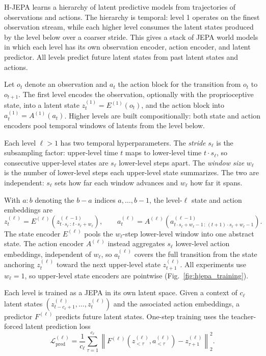 H-JEPA learns a hierarchy of latent predictive models from trajectories of
observations and actions.  The hierarchy is temporal: level 1 operates on the
finest observation stream, while each higher level consumes the latent states
produced by the level below over a coarser stride.  This gives a stack of JEPA
world models in which each level has its own observation encoder, action encoder, and
latent predictor. All levels predict future
latent states from past latent states and actions.

Let $o_t$ denote an observation and $a_t$ the action block for the transition
from $o_t$ to $o_{t+1}$.  The first level encodes the observation, optionally with
the proprioceptive state, into a latent state $z^{(1)}_t = E^{(1)}(o_t)$, and the
action block into $a^{(1)}_t = A^{(1)}(a_t)$.  Higher levels are built
compositionally: both state and action encoders pool temporal windows of latents from the level below.

Each level $\ell>1$ has two temporal hyperparameters.  The \emph{stride}
$s_\ell$ is the subsampling factor: upper-level time $t$ maps to lower-level time
$t\cdot s_\ell$, so consecutive upper-level states are $s_\ell$ lower-level steps
apart.  The \emph{window size} $w_\ell$ is the number of lower-level steps
each upper-level state summarizes. The two are independent: $s_\ell$ sets how
far each window advances and $w_\ell$ how far it spans.

With $a{:}b$ denoting the $b{-}a$ indices $a,\ldots,b{-}1$, the
level-$\ell$ state and action embeddings are
\begin{equation}
\label{eq:level-state}
z^{(\ell)}_t = E^{(\ell)}\!\left(z^{(\ell-1)}_{t\cdot s_\ell\,:\,t\cdot s_\ell+w_\ell}\right),
\qquad
a^{(\ell)}_t = A^{(\ell)}\!\left(a^{(\ell-1)}_{t\cdot s_\ell+w_\ell-1\,:\,(t+1)\cdot s_\ell+w_\ell-1}\right).
\end{equation}
The state encoder $E^{(\ell)}$ pools the $w_\ell$-step lower-level window into one
abstract state.  The action encoder $A^{(\ell)}$ instead aggregates
$s_\ell$ lower-level action embeddings, independent
of $w_\ell$, so $a^{(\ell)}_t$ covers the full transition from the state
anchoring $z^{(\ell)}_t$ toward the next upper-level state $z^{(\ell)}_{t+1}$.
All experiments use $w_\ell{=}1$, so upper-level state encoders are pointwise
(Fig.~\ref{fig:hjepa_training}).

Each level is trained as a JEPA in its own latent
space. Given a context of $c_\ell$ latent states
$(z^{(\ell)}_{t-c_\ell+1}, \ldots, z^{(\ell)}_t)$ and the associated action embeddings,
a predictor $F^{(\ell)}$ predicts future latent states.  One-step
training uses the teacher-forced latent prediction loss
\begin{equation}
\label{eq:pred-loss}
\mathcal{L}^{(\ell)}_{\mathrm{pred}}
= \frac{1}{c_\ell}
\sum_{\tau=1}^{c_\ell}
\left\|
F^{(\ell)}(z^{(\ell)}_{<\tau}, a^{(\ell)}_{<\tau}) - z^{(\ell)}_{\tau+1}
\right\|_2^2 .
\end{equation}

